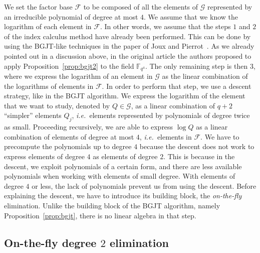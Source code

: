 \documentclass[a4paper,11pt]{article}
\theoremstyle{break}
\theoremstyle{sc}
\theoremstyle{definition}
\theoremstyle{remark}
\newcommand{\ie}{\emph{i.e.\ }}
\begin{document}
We set the factor base $\mathcal F$ to be composed of all the
elements of $\mathcal G$ represented by an irreducible polynomial of degree at
most $4$. We assume that we know the logarithm of each element in
$\mathcal F$. In other words, we assume that the steps $1$ and $2$ of the index
calculus method have already been performed. This can be done by using the BGJT-like
techniques in the paper of Joux and Pierrot~\cite{JP14}. As we already pointed
out in a discussion above, in the original article
the authors proposed to apply 
Proposition~\ref{prop:bgjt2} to the field $\mathbb{F}_{q^4}$. The only remaining
step is then $3$, where we express the logarithm of an element in $\mathcal G$
as the linear combination of the logarithms of elements in $\mathcal F$. In
order to perform that step, we use a descent strategy, like in the BGJT
algorithm. We express the logarithm of the element that we want
to study, denoted by $Q\in\mathcal G$, as a linear combination of 
$q+2$ ``simpler'' elements $Q_j$, \ie elements represented by polynomials of degree twice
as small. Proceeding recursively, we are able to express $\log Q$ as a
linear combination of elements of degree at most $4$, \ie elements in $\mathcal
F$. We
have to precompute the polynomials up to degree $4$ because the descent
does not work to express elements of degree $4$ as elements of
degree $2$. This is because in the descent, we exploit polynomials of a certain
form, and there are less available polynomials when working with elements of
small degree. With elements of degree $4$ or less, the lack of polynomials
prevent us from using the descent.
Before explaining the descent, we have to introduce its building block, the
\emph{on-the-fly} elimination. Unlike the building block of the BGJT algorithm,
namely Proposition~\ref{prop:bgjt}, there is no linear algebra in that step.\subsection{On-the-fly degree $2$ elimination}
\label{subsec:on-the-fly}
\end{document}
